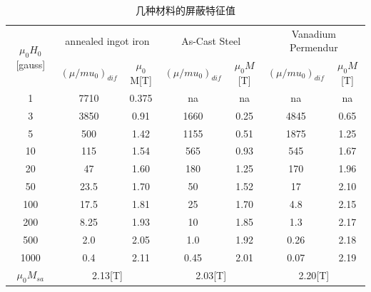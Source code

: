 \begin{table}[]
\centering
\caption{几种材料的屏蔽特征值}
\label{my-label}
\begin{tabular}{|c|c|c|c|c|c|c|}
\hline
\multirow{2}{*}{$\mu_0 H_0$[gauss]} & \multicolumn{2}{c|}{annealed ingot iron} & \multicolumn{2}{c|}{As-Cast Steel} & \multicolumn{2}{c|}{Vanadium Permendur} \\ \cline{2-7}
                                  &$ (\mu/mu_0)_{dif} $      & $\mu_0 $M[T]  & $(\mu/mu_0)_{dif}   $ &$ \mu_0 M$[T]   &$ (\mu/mu_0)_{dif}    $  & $\mu_0 M$[T]      \\ \hline
1                                 & 7710                   & 0.375           & na                  & na           & na                    & na              \\ \hline
3                                 & 3850                   & 0.91            & 1660                & 0.25         & 4845                  & 0.65            \\ \hline
5                                 & 500                    & 1.42            & 1155                & 0.51         & 1875                  & 1.25            \\ \hline
10                                & 115                    & 1.54            & 565                 & 0.93         & 545                   & 1.67            \\ \hline
20                                & 47                     & 1.60            & 180                 & 1.25         & 170                   & 1.96            \\ \hline
50                                & 23.5                   & 1.70            & 50                  & 1.52         & 17                    & 2.10            \\ \hline
100                               & 17.5                   & 1.81            & 25                  & 1.70         & 4.8                   & 2.15            \\ \hline
200                               & 8.25                   & 1.93            & 10                  & 1.85         & 1.3                   & 2.17            \\ \hline
500                               & 2.0                    & 2.05            & 1.0                 & 1.92         & 0.26                  & 2.18            \\ \hline
1000                              & 0.4                    & 2.11            & 0.45                & 2.01         & 0.07                  & 2.19            \\ \hline
$\mu_0 M_{sa} $                     & \multicolumn{2}{c|}{2.13[T]}             & \multicolumn{2}{c|}{2.03[T]}       & \multicolumn{2}{c|}{2.20[T]}            \\ \hline
\end{tabular}
\end{table}

